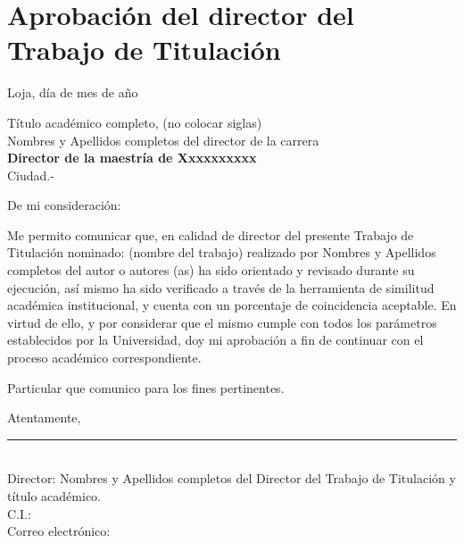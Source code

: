 \chapter*{Aprobación del director del Trabajo de Titulación}

\vspace{1cm}

Loja, día de mes de año

\vspace{1cm}

Título académico completo, (no colocar siglas)\\
Nombres y Apellidos completos del director de la carrera\\
\textbf{Director de la maestría de Xxxxxxxxxx}\\
Ciudad.-

\vspace{1cm}

De mi consideración:

\vspace{0.5cm}

Me permito comunicar que, en calidad de director del presente Trabajo de Titulación nominado: (nombre del trabajo) realizado por Nombres y Apellidos completos del autor o autores (as) ha sido orientado y revisado durante su ejecución, así mismo ha sido verificado a través de la herramienta de similitud académica institucional, y cuenta con un porcentaje de coincidencia aceptable. En virtud de ello, y por considerar que el mismo cumple con todos los parámetros establecidos por la Universidad, doy mi aprobación a fin de continuar con el proceso académico correspondiente.

\vspace{0.5cm}

Particular que comunico para los fines pertinentes.

\vspace{1cm}

Atentamente,

\vspace{3cm}

\noindent
\rule{8cm}{0.4pt}\\
Director: Nombres y Apellidos completos del Director del Trabajo de Titulación y título académico.\\
C.I.:\\
Correo electrónico: